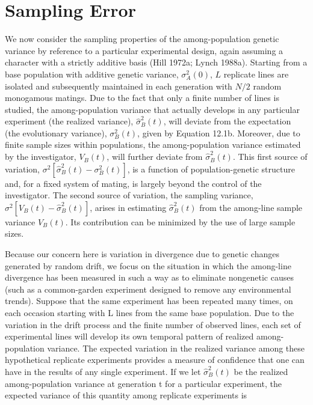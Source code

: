 \documentclass{article}
\begin{document}
\section{Sampling Error}
We now consider the sampling properties of the among-population genetic variance by reference to a particular experimental design, again assuming a character with a strictly additive basis (Hill 1972a; Lynch 1988a). Starting from a base population with additive genetic variance,  $ \sigma_A^2(0) $,  $ L $ replicate lines are isolated and subsequently maintained in each generation with  $ N/2 $ random monogamous matings. Due to the fact that only a finite number of lines is studied, the among-population variance that actually develops in any particular experiment (the realized variance),  $ \widehat{\sigma}_B^2(t) $, will deviate from the expectation (the evolutionary variance),  $ \sigma_B^2(t) $, given by Equation 12.1b. Moreover, due to finite sample sizes within populations, the among-population variance estimated by the investigator,  $ V_B(t) $, will further deviate from  $ \widehat{\sigma}_B^2(t) $. This first source of variation,  $ \sigma^2[\widehat{\sigma}_B^2(t) - \sigma_B^2(t)] $, is a function of population-genetic structure and, for a fixed system of mating, is largely beyond the control of the investigator. The second source of variation, the sampling variance,  $ \sigma^2[V_B(t) - \widehat{\sigma}_B^2(t)] $, arises in estimating  $ \widehat{\sigma}_B^2(t) $ from the among-line sample variance  $ V_B(t) $. Its contribution can be minimized by the use of large sample sizes.

Because our concern here is variation in divergence due to genetic changes generated by random drift, we focus on the situation in which the among-line divergence has been measured in such a way as to eliminate nongenetic causes (such as a common-garden experiment designed to remove any environmental trends). Suppose that the same experiment has been repeated many times, on each occasion starting with L lines from the same base population. Due to the variation in the drift process and the finite number of observed lines, each set of experimental lines will develop its own temporal pattern of realized among-population variance. The expected variation in the realized variance among these hypothetical replicate experiments provides a measure of confidence that one can have in the results of any single experiment. If we let  $ \widehat{\sigma}_{B}^{2}(t) $ be the realized among-population variance at generation t for a particular experiment, the expected variance of this quantity among replicate experiments is
\end{document}
